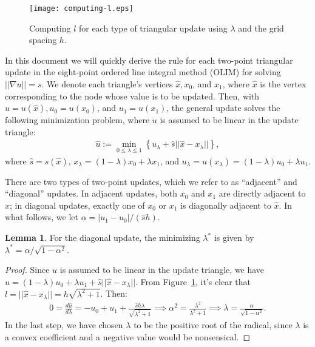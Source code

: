 \documentclass{article}
\theoremstyle{definition}
\newtheorem{lemma}{Lemma}
\begin{document}
\begin{figure}[h]
  \centering
  \texttt{[image: computing-l.eps]}
  \caption{Computing $l$ for each type of triangular update using $\lambda$ and the grid spacing $h$.}
  \label{fig:computing-l}
\end{figure}

In this document we will quickly derive the rule for each two-point
triangular update in the eight-point ordered line integral method
(OLIM) for solving $||\nabla u|| = s$. We denote each triangle's
vertices $\hat{x}, x_0$, and $x_1$, where $\hat{x}$ is the vertex
corresponding to the node whose value is to be updated. Then, with
$\hat{u} = u(\hat{x}), u_0 = u(x_0)$, and $u_1 = u(x_1)$, the general
update solves the following minimization problem, where $u$ is assumed
to be linear in the update triangle:
\begin{align*}
  \hat{u} := \min_{0 \leq \lambda \leq 1} \left\{ u_\lambda + \hat{s} ||\hat{x} - x_\lambda||\right\},
\end{align*}
where $\hat{s} = s(\hat{x})$, $x_\lambda = (1 - \lambda) x_0 + \lambda x_1$, and
$u_\lambda = u(x_\lambda) = (1 - \lambda)u_0 + \lambda u_1$.

There are two types of two-point updates, which we refer to as
``adjacent'' and ``diagonal'' updates. In adjacent updates, both $x_0$
and $x_1$ are directly adjacent to $\hat{x}$; in diagonal updates,
exactly one of $x_0$ or $x_1$ is diagonally adjacent to $\hat{x}$. In
what follows, we let $\alpha = |u_1 - u_0|/(\hat{s} h)$.

\begin{lemma}
  For the diagonal update, the minimizing $\lambda^*$ is given by
  $\lambda^* = \alpha/\sqrt{1 - \alpha^2}$.
\end{lemma}

\begin{proof}
  Since $u$ is assumed to be linear in the update triangle, we have
  $\hat{u} = (1 - \lambda) u_0 + \lambda u_1 + \hat{s} ||\hat{x} -
  x_\lambda||$. From Figure~\ref{fig:computing-l}, it's clear that
  $l = ||\hat{x} - x_\lambda|| = h \sqrt{\lambda^2 + 1}$. Then:
  \begin{align*}
    0 = \frac{d \hat{u}}{d \lambda} = -u_0 + u_1 + \frac{\hat{s} h \lambda}{\sqrt{\lambda^2 + 1}} \implies \alpha^2 = \frac{\lambda^2}{\lambda^2 + 1} \implies \lambda = \frac{\alpha}{\sqrt{1 - \alpha^2}}.
  \end{align*}
  In the last step, we have chosen $\lambda$ to be the positive root
  of the radical, since $\lambda$ is a convex coefficient and a
  negative value would be nonsensical.
\end{proof}
\end{document}
